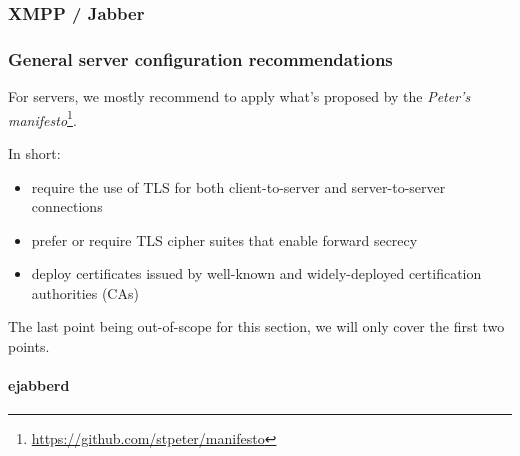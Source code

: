 \subsubsection{XMPP / Jabber}


\subsubsection{General server configuration recommendations}

For servers, we mostly recommend to apply what's proposed by the \emph{Peter's manifesto}\footnote{\url{https://github.com/stpeter/manifesto}}.

In short:
\begin{itemize}
    \item require the use of TLS for both client-to-server and server-to-server connections
    \item prefer or require TLS cipher suites that enable forward secrecy
    \item deploy certificates issued by well-known and widely-deployed certification authorities (CAs)
\end{itemize}

The last point being out-of-scope for this section, we will only cover the first two points.

\paragraph{ejabberd}

